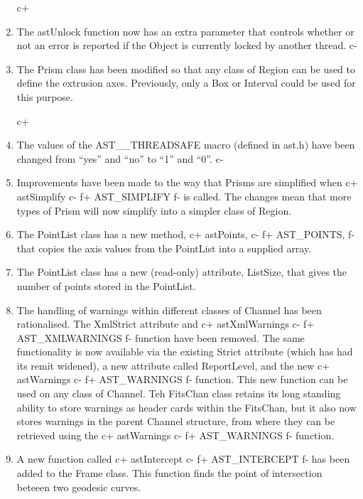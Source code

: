 \documentclass[twoside,11pt]{article}
\begin{document}
\begin{enumerate}

c+
\item The astUnlock function now has an extra parameter that controls whether
or not an error is reported if the Object is currently locked by another
thread.
c-

\item The Prism class has been modified so that any class of Region can
be used to define the extrusion axes. Previously, only a Box or Interval
could be used for this purpose.

c+
\item The values of the AST\_\_THREADSAFE macro (defined in ast.h) have
been changed from ``yes'' and ``no'' to ``1'' and ``0''.
c-

\item Improvements have been made to the way that Prisms are simplified
when
c+
astSimplify
c-
f+
AST\_SIMPLIFY
f-
is called.  The changes mean that more types of Prism will now simplify
into a simpler class of Region.

\item The PointList class has a new method,
c+
astPoints,
c-
f+
AST\_POINTS,
f-
that copies the axis values from the PointList into a supplied array.

\item The PointList class has a new (read-only) attribute, ListSize, that
gives the number of points stored in the PointList.

\item The handling of warnings within different classes of Channel has
been rationalised. The XmlStrict attribute and
c+
astXmlWarnings
c-
f+
AST\_XMLWARNINGS
f-
function have been removed. The same functionality is now available via
the existing Strict attribute (which has had its remit widened), a new
attribute called ReportLevel, and the new
c+
astWarnings
c-
f+
AST\_WARNINGS
f-
function. This new function can be used on any class of Channel. Teh
FitsChan class retains its long standing ability to store warnings as
header cards within the FitsChan, but it also now stores warnings in the
parent Channel structure, from where they can be retrieved using the
c+
astWarnings
c-
f+
AST\_WARNINGS
f-
function.

\item A new function called
c+
astIntercept
c-
f+
AST\_INTERCEPT
f-
has been added to the Frame class. This function finds the point of
intersection beteeen two geodesic curves.


\end{enumerate}
\end{document}
